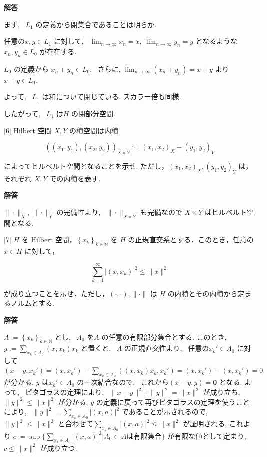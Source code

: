 \documentclass{jsarticle}
\begin{document}
\textbf{解答}

まず, \ $L_1$ の定義から閉集合であることは明らか.

任意の$x, y \in L_1$ に対して, \ $\displaystyle \lim_{n \to \infty} x_n = x, \ \lim_{n \to \infty} y_n = y$ となるような$x_n, y_n \in L_0$ が存在する.

$L_0$ の定義から $x_n + y_n \in L_0$, \ さらに, $\displaystyle \lim_{n \to \infty} (x_n + y_n) = x + y$ より $x + y \in L_1$.

よって, \ $L_1$ は和について閉じている. スカラー倍も同様.

したがって, \ $L_1$ は$H$ の閉部分空間.
 
\bigskip
\bigskip

\begin{itembox}[l]{[6]}
  Hilbert 空間 $X, Y$ の積空間は内積

$$
\left(\left(x_{1}, y_{1}\right),\left(x_{2}, y_{2}\right)\right)_{X \times Y}:=\left(x_{1}, x_{2}\right)_{X}+\left(y_{1}, y_{2}\right)_{Y}
$$

によってヒルベルト空間となることを示せ. ただし，$\left(x_{1}, x_{2}\right)_{X},\left(y_{1}, y_{2}\right)_{Y}$ は，それぞれ $X, Y$ での内積を表す.
\end{itembox}

\textbf{解答}

$\|\cdot\|_X, \ \|\cdot\|_Y$ の完備性より, \ $\|\cdot\|_{X\times Y}$ も完備なので $X \times Y$ はヒルベルト空間となる.

\bigskip
\bigskip

\begin{itembox}[l]{[7]}
 $H$ を Hilbert 空間，$\left\{x_{k}\right\}_{k \in \mathbb{N}}$ を $H$ の正規直交系とする．このとき，任意の $x \in H$ に対して，

$$
\sum_{k=1}^{\infty}\left|\left(x, x_{k}\right)\right|^{2} \leq\|x\|^{2}
$$

が成り立つことを示せ．ただし，$(\cdot, \cdot),\|\cdot\|$ は $H$ の内積とその内積から定まるノルムとする. 
\end{itembox}

\textbf{解答}

$A := \left\{x_{k}\right\}_{k \in \mathbb{N}}$ とし, \ $A_0$ を$A$ の任意の有限部分集合とする. このとき, \ $y := \sum_{x_k \in A_0}(x, x_k)x_k$ と置くと, \ $A$ の正規直交性より, \ 任意の$x_k' \in A_0$ に対して $(x-y, x_k') = (x, x_k') - \displaystyle \sum_{x_k \in A_0} ((x, x_k)x_k, x_k') = (x, x_k') - (x, x_k') = 0$ が分かる. $y$ は$x_k' \in A_0$ の一次結合なので, \ これから$(x-y, y) = \bm{0}$ となる. よって, \ ピタゴラスの定理により, \ $\|x-y\|^2 + \|y\|^2 = \|x\|^2$ が成り立ち, \ $\|y\|^2 \le \|x\|^2$ が分かる. $y$ の定義に戻って再びピタゴラスの定理を使うことにより, \ $\|y\|^2 = \displaystyle \sum_{x_k \in A_0} |(x, a)|^2$ であることが示されるので, \ $\|y\|^2 \le \|x\|^2$ と合わせて$\displaystyle \sum_{x_k \in A_0} |(x, a)|^2 \le \|x\|^2$ が証明される. これより $c := \sup\{\displaystyle \sum_{x_k \in A_0} |(x, a)|^2 | A_0 \subset A は有限集合 \}$ が有限な値として定まり, \ $c \le \|x\|^2$ が成り立つ.
\end{document}
